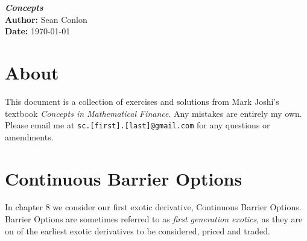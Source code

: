 \documentclass{article}
\begin{document}
\begin{titlepage}
    \centering
    {\Huge \textbf{\textit{Concepts}}}\\[1.5cm] %
    \textbf{Author:} Sean Conlon\\[1cm] %
    \textbf{Date:} \today\\[3cm] %
    
    \section*{About}
    This document is a collection of exercises and solutions from Mark Joshi's textbook \textit{Concepts in Mathematical Finance}. Any mistakes are entirely my own. Please email me at \texttt{sc.[first].[last]@gmail.com} for any questions or amendments.\\[2cm]

    \tableofcontents
    
\end{titlepage}

\newpage
\section{Continuous Barrier Options}

In chapter 8 we consider our first exotic derivative, Continuous Barrier Options. Barrier Options are sometimes referred to as \textit{first generation exotics}, as they are on of the earliest exotic derivatives to be considered, priced and traded. 
\end{document}
